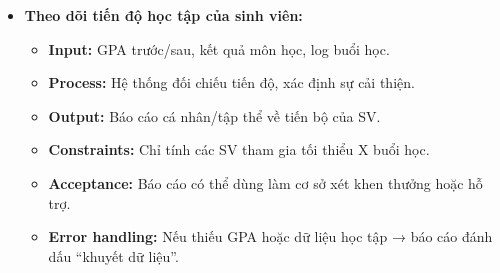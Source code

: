 \begin{itemize}
    \item \textbf{Theo dõi tiến độ học tập của sinh viên:}
    \begin{itemize}
        \item \textbf{Input:} GPA trước/sau, kết quả môn học, log buổi học.
        \item \textbf{Process:} Hệ thống đối chiếu tiến độ, xác định sự cải thiện.
        \item \textbf{Output:} Báo cáo cá nhân/tập thể về tiến bộ của SV.
        \item \textbf{Constraints:} Chỉ tính các SV tham gia tối thiểu X buổi học.
        \item \textbf{Acceptance:} Báo cáo có thể dùng làm cơ sở xét khen thưởng hoặc hỗ trợ.
        \item \textbf{Error handling:} Nếu thiếu GPA hoặc dữ liệu học tập → báo cáo đánh dấu “khuyết dữ liệu”.
    \end{itemize}
\end{itemize}


